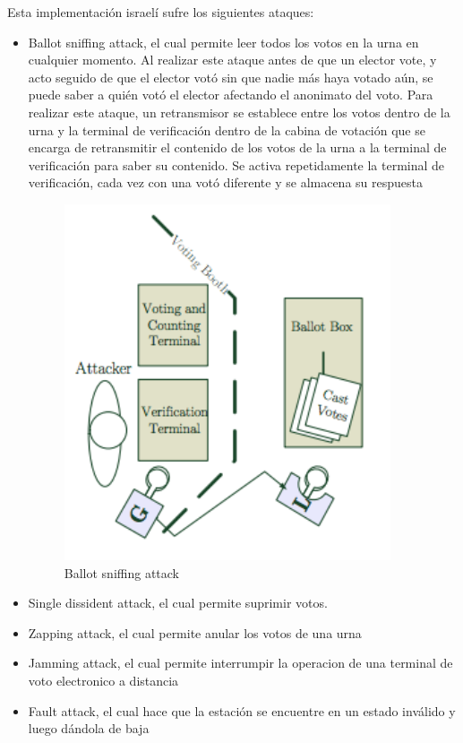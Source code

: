 Esta implementación israelí sufre los siguientes ataques:
\begin{itemize}
	\item Ballot sniffing attack, el cual permite leer todos los votos en la urna en cualquier momento. Al realizar este ataque antes de que un elector vote, y acto seguido de que el elector votó sin que nadie más haya votado aún, se puede saber a quién votó el elector afectando el anonimato del voto.
Para realizar este ataque, un retransmisor se establece entre los votos dentro de la urna y la terminal de verificación dentro de la cabina de votación que se encarga de retransmitir el contenido de los votos de la urna a la terminal de verificación para saber su contenido. Se activa repetidamente la terminal de verificación, cada vez con una votó diferente y se almacena su respuesta
\begin{figure}[h!]
\includegraphics{Imagenes/privacidad3}
\caption{Ballot sniffing attack}
\end{figure}
	\item Single dissident attack, el cual permite suprimir votos.

	\item Zapping attack, el cual permite anular los votos de una urna

	\item Jamming attack, el cual permite interrumpir la operacion de una terminal de voto electronico a distancia

	\item Fault attack, el cual hace que la estación se encuentre en un estado inválido y luego dándola de baja

\end{itemize}

